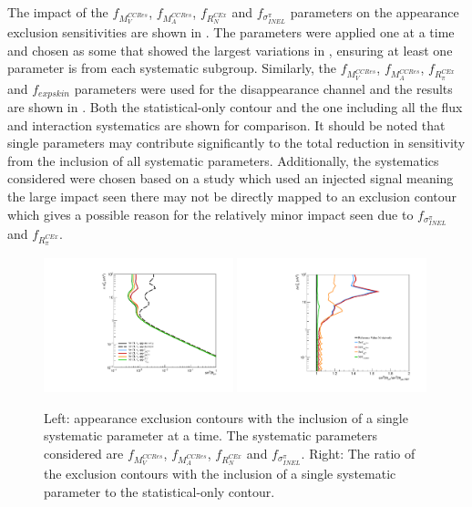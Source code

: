 The impact of the $f_{M_V^{CCRes}}$, $f_{M_A^{CCRes}}$, $f_{R_N^{C Ex}}$ and $f_{\sigma^{\pi}_{INEL}}$ parameters on the \nue appearance exclusion sensitivities are shown in . The parameters were applied one at a time and chosen as some that showed the largest variations in , ensuring at least one parameter is from each systematic subgroup. Similarly, the $f_{M_V^{CCRes}}$, $f_{M_A^{CCRes}}$, $f_{R_{\pi}^{C Ex}}$ and $f_{expskin}$ parameters were used for the \nue disappearance channel and the results are shown in . Both the statistical-only contour and the one including all the flux and interaction systematics are shown for comparison. It should be noted that single parameters may contribute significantly to the total reduction in sensitivity from the inclusion of all systematic parameters. Additionally, the systematics considered were chosen based on a study which used an injected signal meaning the large impact seen there may not be directly mapped to an exclusion contour which gives a possible reason for the relatively minor impact seen due to $f_{\sigma^{\pi}_{INEL}}$ and $f_{R_{\pi}^{C Ex}}$.

\begin{figure}[h!]
    \centering
    \includegraphics[width = 0.49\textwidth]{figures-chap6/exclusion_contours/single_param/nue_app_single_param.pdf}
    \includegraphics[width =0.49\textwidth]{figures-chap6/exclusion_contours/single_param/nue_app_single_param_ratio.pdf}
    \caption[\nue appearance exclusion contours with the inclusion of a single systematic parameter at a time.]{Left: \nue appearance exclusion contours with the inclusion of a single systematic parameter at a time. The systematic parameters considered are $f_{M_V^{CCRes}}$, $f_{M_A^{CCRes}}$, $f_{R_N^{C Ex}}$ and $f_{\sigma^{\pi}_{INEL}}$. Right: The ratio of the exclusion contours with the inclusion of a single systematic parameter to the statistical-only contour.}
    \label{fig:nue_app_single_param}
\end{figure}

